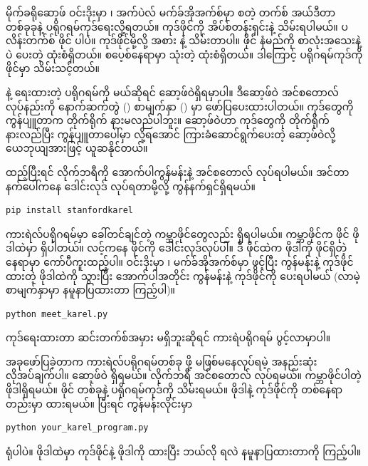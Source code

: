 မိုက်ခရိုဆော့ဖ် ဝင်းဒိုးမှာ  ၊ အက်ပဲလ် မက်ခ်အိုအက်စ်မှာ   စတဲ့ တက်စ် အယ်ဒီတာတစ်ခုခုနဲ့ ပရိုဂရမ်ကုဒ်ရေးလို့ရတယ်။ ကုဒ်ဖိုင်ကို  အိပ်စ်တန်းရှင်းနဲ့ သိမ်းရပါမယ်။ ပလိန်းတက်စ်  ဖိုင် ပါပဲ။  ကုဒ်ဖိုင်မို့လို့  အစား  နဲ့ သိမ်းတာပါ။  ဖိုင် နံမည်ကို စာလုံးအသေးနဲ့ပဲ ပေးတဲ့ ထုံးစံရှိတယ်။  စပေ့စ်နေရာမှာ \fEnSnd{ \_}  သုံးတဲ့ ထုံးစံရှိတယ်။ ဒါကြောင့်  ပရိုဂရမ်ကုဒ်ကို  ဖိုင်မှာ သိမ်းသင့်တယ်။ 

 နဲ့ ရေးထားတဲ့ ပရိုဂရမ်ကို  မယ်ဆိုရင်  ဆော့ဖ်ဝဲရှိရမှာပါ။ ဒီဆော့ဖ်ဝဲ အင်စတောလ် လုပ်နည်းကို နောက်ဆက်တွဲ (\fRefNo{\ref{apdx:01}}) စာမျက်နှာ (\fRefNo{\pageref{subsec:pyinstl}}) မှာ ဖော်ပြပေးထားပါတယ်။  ကုဒ်တွေကို ကွန်ပျူတာက တိုက်ရိုက် နားမလည်ပါဘူး။  ဆော့ဖ်ဝဲဟာ  ကုဒ်တွေကို တိုက်ရိုက် နားလည်ပြီး ကွန်ပျူတာပေါ်မှာ  လို့ရအောင် ကြားခံဆောင်ရွက်ပေးတဲ့ ဆော့ဖ်ဝဲလို့ ယေဘုယျအားဖြင့် ယူဆနိုင်တယ်။

 ထည့်ပြီးရင်  လိုက်ဘရီကို အောက်ပါကွန်မန်းနဲ့ အင်စတောလ် လုပ်ရပါမယ်။ အင်တာနက်ပေါ်ကနေ ဒေါင်းလုဒ် လုပ်ရတာမို့လို့ ကွန်နက်ရှင်ရှိရမယ်။
%
\begin{verbatim}
pip install stanfordkarel
\end{verbatim}
%

ကားရဲလ်ပရိုဂရမ်မှာ ခေါ်တင်ချင်တဲ့ ကမ္ဘာဖိုင်တွေလည်း ရှိရပါမယ်။   ကမ္ဘာဖိုင်က  ဖိုင်  ဖိုဒါထဲမှာ ရှိပါတယ်။   လင့်ကနေ   ဖိုင်ကို ဒေါင်းလုဒ်လုပ်ပါ။ ဒီ  ဖိုင်ထဲက  ဖိုဒါကို  ဖိုင်ရှိတဲ့နေရာမှာ ကော်ပီကူးထည့်ပါ။ ဝင်းဒိုးမှာ  ၊ မက်ခ်အိုအက်စ်မှာ   ဖွင့်ပြီး  ကွန်မန်းနဲ့ ကုဒ်ဖိုင်ထားတဲ့ ဖိုဒါထဲကို သွားပြီး အောက်ပါအတိုင်း  ကွန်မန်းနဲ့ ကုဒ်ဖိုင်ကို  ပေးရပါမယ် (လာမဲ့စာမျက်နှာမှာ နမူနာပြထားတာ ကြည့်ပါ)။ 
%
\begin{verbatim}
python meet_karel.py
\end{verbatim}
ကုဒ်ရေးထားတာ ဆင်းတက်စ်အမှား မရှိဘူးဆိုရင် ကားရဲပရိုဂရမ် ပွင့်လာမှာပါ။

အခုဖော်ပြခဲ့တာက ကားရဲလ်ပရိုဂရမ်တစ်ခု  ဖို့ မဖြစ်မနေလုပ်ရမဲ့ အနည်းဆုံးလိုအပ်ချက်ပါ။  ဆော့ဖ်ဝဲ ရှိရမယ်။  လိုက်ဘရီ အင်စတောလ် လုပ်ရမယ်။ ကမ္ဘာဖိုင်ပါတဲ့  ဖိုဒါရှိရမယ်။  ဖိုင် တစ်ခုနဲ့ ပရိုဂရမ်ကုဒ်ကို သိမ်းရမယ်။  ဖိုဒါနဲ့ ကုဒ်ဖိုင်ကို တစ်နေရာတည်းမှာ ထားရမယ်။ ပြီးရင် ကွန်မန်းလိုင်းမှာ 
%
\begin{verbatim}
python your_karel_program.py
\end{verbatim}
 ရုံပါပဲ။
 ဖိုဒါထဲမှာ ကုဒ်ဖိုင်နဲ့  ဖိုဒါကို ထားပြီး ဘယ်လို  ရလဲ နမူနာပြထားတာကို ကြည့်ပါ။

